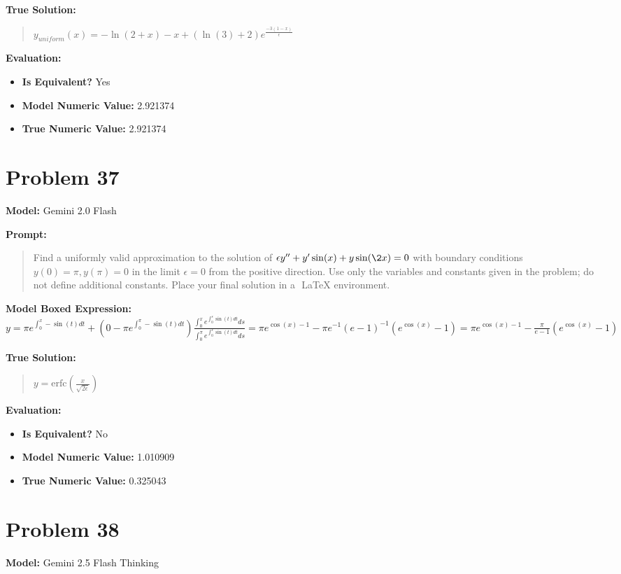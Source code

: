 \documentclass{article}
\begin{document}
\textbf{True Solution:}
\begin{quote}
$y_{uniform}(x) = - \ln(2+x) -x + (\ln(3) + 2)e^{\frac{-3(1-x)}{\epsilon}}$
\end{quote}

\textbf{Evaluation:}
\begin{itemize}
\item \textbf{Is Equivalent?} Yes
\item \textbf{Model Numeric Value:} 2.921374
\item \textbf{True Numeric Value:} 2.921374
\end{itemize}
\vspace{1cm}
\section*{Problem 37}
\textbf{Model:} Gemini 2.0 Flash

\textbf{Prompt:}
\begin{quote}
Find a uniformly valid approximation to the solution of $ \epsilon y'' + y' \sin(x) + y \sin(\2x) = 0$ with boundary conditions $ y(0) = \pi, y(\pi) = 0 $ in the limit $\epsilon = 0$ from the positive direction. Use only the variables and constants given in the problem; do not define additional constants. Place your final solution in a $\boxed{}$ LaTeX environment.
\end{quote}
\textbf{Model Boxed Expression:} $y = \pi e^{\int_0^x -\sin(t) dt} + (0 - \pi e^{\int_0^\pi -\sin(t) dt}) \frac{\int_0^x e^{\int_0^s \sin(t) dt} ds}{\int_0^\pi e^{\int_0^s \sin(t) dt} ds} = \pi e^{\cos(x) - 1} - \pi e^{-1} (e - 1)^{-1} (e^{\cos(x)} - 1) = \pi e^{\cos(x) - 1} - \frac{\pi}{e-1}(e^{\cos(x)} - 1)$

\textbf{True Solution:}
\begin{quote}
$y = \text{erfc}(\frac{x}{\sqrt{2\epsilon}})$
\end{quote}

\textbf{Evaluation:}
\begin{itemize}
\item \textbf{Is Equivalent?} No
\item \textbf{Model Numeric Value:} 1.010909
\item \textbf{True Numeric Value:} 0.325043
\end{itemize}
\vspace{1cm}
\section*{Problem 38}
\textbf{Model:} Gemini 2.5 Flash Thinking
\end{document}
